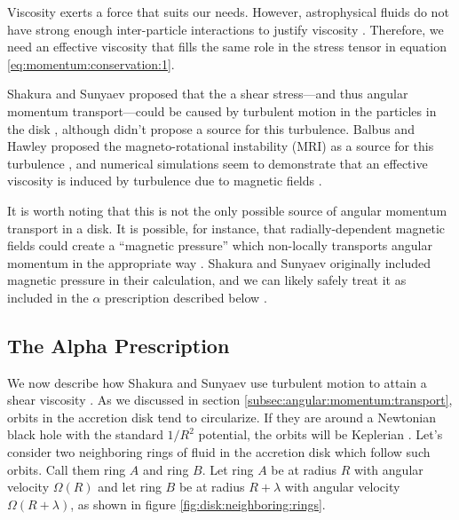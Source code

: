 \documentclass[]{article}
\begin{document}
Viscosity exerts a force that suits our needs. However, astrophysical
fluids do not have strong enough inter-particle interactions to
justify viscosity
\cite{PadmanabhanTA,Melia,ShakuraSunyaev73}. Therefore, we need an
effective viscosity that fills the same role in the stress tensor in
equation \eqref{eq:momentum:conservation:1}.

Shakura and Sunyaev proposed that the a shear stress---and thus
angular momentum transport---could be caused by turbulent motion in
the particles in the disk \cite{ShakuraSunyaev73}, although didn't
propose a source for this turbulence. Balbus and Hawley proposed the
magneto-rotational instability (MRI) as a source for this turbulence
\cite{VanBommel,BalbusHawley1,BalbusHawley2,BalbusHawley3,BalbusHawley4},
and numerical simulations seem to demonstrate that an effective
viscosity is induced by turbulence due to magnetic fields
\cite{Melia,LehnerReview01,Font08,BucciantiniZanna13,HawleyGammieBalbus95,HawleyGammieBalbus96}.

It is worth noting that this is not the only possible source of
angular momentum transport in a disk. It is possible, for instance,
that radially-dependent magnetic fields could create a ``magnetic
pressure'' which non-locally transports angular momentum in the
appropriate way \cite{Frank,PadmanabhanTA,ShakuraSunyaev73}. Shakura
and Sunyaev originally included magnetic pressure in their
calculation, and we can likely safely treat it as included in the
$\alpha$ prescription described below \cite{ShakuraSunyaev73}.

\subsection{The Alpha Prescription}
\label{subsec:the:alpha:prescription}

We now describe how Shakura and Sunyaev use turbulent motion to attain
a shear viscosity \cite{Frank,Melia,ShakuraSunyaev73}. As we discussed
in section \ref{subsec:angular:momentum:transport}, orbits in the
accretion disk tend to circularize. If they are around a Newtonian
black hole with the standard $1/R^2$ potential, the orbits will be
Keplerian \cite{Frank,Melia,ShakuraSunyaev73}. Let's consider two
neighboring rings of fluid in the accretion disk which follow such
orbits. Call them ring $A$ and ring $B$. Let ring $A$ be at radius $R$
with angular velocity $\Omega(R)$ and let ring $B$ be at radius
$R+\lambda$ with angular velocity $\Omega(R+\lambda)$, as shown in
figure \ref{fig:disk:neighboring:rings}.
\end{document}

